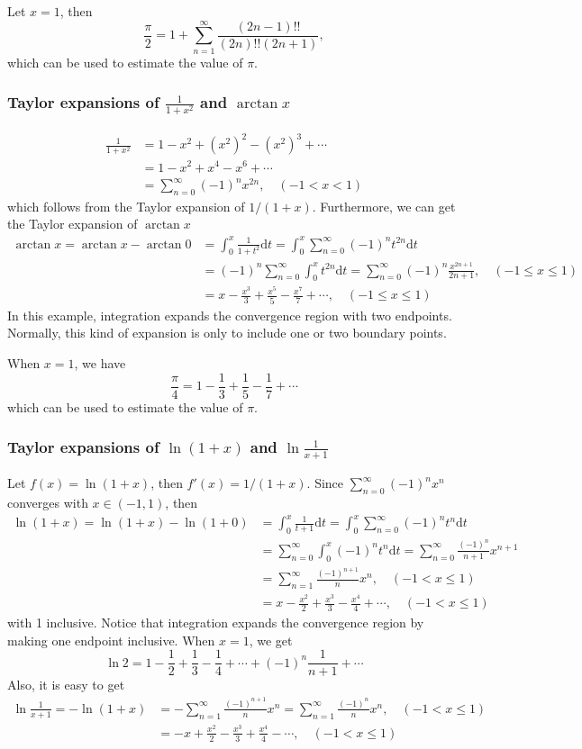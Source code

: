 \documentclass{article}
\theoremstyle{remark}
\begin{document}
Let $x=1$, then
\[
\frac{\pi}{2}=1+\sum_{n=1}^{\infty}\frac{(2n-1)!!}{(2n)!!(2n+1)},
\]
which can be used to estimate the value of $\pi$.



\subsubsection{Taylor expansions of $\frac{1}{1+x^2}$ and $\arctan x$}
\begin{align*}
\frac{1}{1+x^2}&=1-x^2+(x^2)^2-(x^2)^3+\cdots\\
&=1-x^2+x^4-x^6+\cdots\\
&=\sum_{n=0}^{\infty}(-1)^{n}x^{2n},\quad (-1< x< 1)
\end{align*}
which follows from the Taylor expansion of $1/(1+x)$. Furthermore, we can get the Taylor expansion of $\arctan x$
\begin{align*}
  \arctan x=\arctan x-\arctan 0&= \int_{0}^{x}\frac{1}{1+t^2}\mathrm{d}t
  =\int_{0}^{x} \sum_{n=0}^{\infty}(-1)^{n}t^{2n}\mathrm{d}t \\
  &=(-1)^{n} \sum_{n=0}^{\infty}\int_{0}^{x}t^{2n}\mathrm{d}t
  = \sum_{n=0}^{\infty}(-1)^{n}\frac{x^{2n+1}}{2n+1},\quad (-1\le x\le 1)\\
  &=x-\frac{x^3}{3}+\frac{x^5}{5}-\frac{x^7}{7}+\cdots,\quad (-1\le x\le 1)
\end{align*}
In this example, integration expands the convergence region with two endpoints. Normally, this kind of expansion is only to include one or two boundary points.

When $x=1$, we have
\[
\frac{\pi}{4}=1-\frac{1}{3}+\frac{1}{5}-\frac{1}{7}+\cdots
\]
which can be used to estimate the value of $\pi$.

\subsubsection{Taylor expansions of $\ln(1+x)$ and $\ln\frac{1}{x+1}$}
Let $f(x)=\ln(1+x)$, then $f'(x)=1/(1+x)$. Since $\sum_{n=0}^{\infty}(-1)^{n}x^n$ converges with $x\in(-1,1)$, then
\begin{align*}
 \ln(1+x)=\ln(1+x)-\ln(1+0) &=\int_{0}^{x}\frac{1}{t+1}\mathrm{d} t
 =\int_{0}^{x}\sum_{n=0}^{\infty}(-1)^{n}t^n\mathrm{d} t \\
  &=\sum_{n=0}^{\infty}\int_{0}^{x}(-1)^{n}t^n\mathrm{d} t
  =\sum_{n=0}^{\infty}\frac{(-1)^{n}}{n+1}x^{n+1}\\
  &=\sum_{n=1}^{\infty}\frac{(-1)^{n+1}}{n}x^{n},\quad (-1< x\le 1)\\
  &=x-\frac{x^2}{2}+\frac{x^3}{3}-\frac{x^4}{4}+\cdots,\quad (-1< x\le 1)
\end{align*}
with 1 inclusive. Notice that integration expands the convergence region by making one endpoint inclusive. When $x=1$, we get
\[
\ln 2=1-\frac{1}{2}+\frac{1}{3}-\frac{1}{4}+\cdots+(-1)^{n}\frac{1}{n+1}+\cdots
\]
Also, it is easy to get
\begin{align*}
\ln\frac{1}{x+1}=-\ln(1+x)&=-\sum_{n=1}^{\infty}\frac{(-1)^{n+1}}{n}x^{n}
=\sum_{n=1}^{\infty}\frac{(-1)^{n}}{n}x^{n},\quad (-1< x\le 1)\\
&=-x+\frac{x^2}{2}-\frac{x^3}{3}+\frac{x^4}{4}-\cdots,\quad (-1< x\le 1)
\end{align*}
\end{document}
